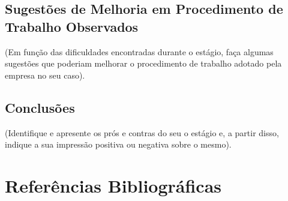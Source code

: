 \documentclass[
	12pt,				%
	openright,			%
	oneside,			%
	a4paper,			%
	english,			%
	french,				%
	spanish,			%
	brazil				%
	]{abntex2}
\begin{document}
\section{Sugestões de Melhoria em Procedimento de Trabalho Observados}
(Em função das dificuldades encontradas durante o estágio, faça algumas sugestões que poderiam melhorar o procedimento de trabalho adotado pela empresa no seu caso).

\section*{Conclusões}
(Identifique e apresente os prós e contras do seu o estágio e, a partir disso, indique a sua impressão positiva ou negativa sobre o mesmo).

\chapter{Referências Bibliográficas}




\postextual



%
%

\end{document}
